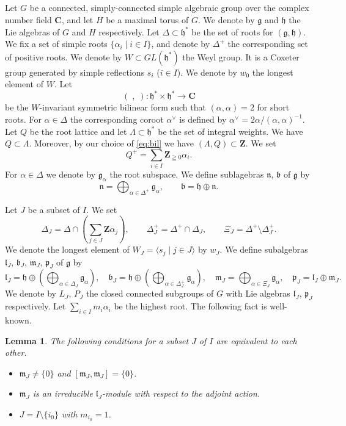 \documentclass[a4paper, 12pt, leqno]{amsart}
\newtheorem{lemma}{{\sc Lemma}}[section]
\theoremstyle{definition}
\numberwithin{equation}{section}
\def\Gb{{\mathfrak{b}}}
\def\Gg{{\mathfrak{g}}}
\def\Gh{{\mathfrak{h}}}
\def\Gl{{\mathfrak{l}}}
\def\Gm{{\mathfrak{m}}}
\def\Gn{{\mathfrak{n}}}
\def\Gp{{\mathfrak{p}}}
\def\BC{{\mathbf{C}}}
\def\BZ{{\mathbf{Z}}}
\begin{document}
\subsection{}
Let $G$ be a connected, simply-connected simple algebraic group over the complex number field $\BC$, and let $H$ be a maximal torus of $G$.
We denote by $\Gg$ and $\Gh$ the Lie algebras of $G$ and $H$ respectively.
Let $\Delta\subset\Gh^*$ be the set of roots for $(\Gg,\Gh)$.
We fix a set of simple roots $\{\alpha_i\mid i\in I\}$, and denote by $\Delta^+$ the corresponding set of positive roots.
We denote by $W\subset GL(\Gh^*)$ the Weyl group.
It is a Coxeter group generated by simple reflections $s_i$ ($i\in I$).
We denote by $w_0$ the longest element of $W$.
Let 
\begin{equation}
\label{eq:bil}
(\;,\;):\Gh^*\times\Gh^*\to\BC
\end{equation}
be the $W$-invariant symmetric bilinear form such that $(\alpha,\alpha)=2$ for short roots.
For $\alpha\in\Delta$ the corresponding coroot $\alpha^\vee$ is defined by $\alpha^\vee=2\alpha/(\alpha,\alpha)^{-1}$.
Let $Q$ 
be the root lattice 
and let $\Lambda\subset\Gh^*$ be the set of integral weights.
We have $Q\subset \Lambda$.
Moreover, 
by our choice of \eqref{eq:bil}
we have 
$(\Lambda, Q)\subset\BZ$.
We set
\[
Q^+=\sum_{i\in I}\BZ_{\geqq0}\alpha_i.
\]
For $\alpha\in\Delta$ we denote by $\Gg_\alpha$ the root subspace.
We define sublagebras $\Gn$, $\Gb$ of $\Gg$ by
\[
\Gn=\bigoplus_{\alpha\in\Delta^+}\Gg_\alpha,
\qquad
\Gb=\Gh\oplus\Gn.
\]


Let  $J$ be a subset of $I$. 
We set
\[
\Delta_J=\Delta\cap\left(
\sum_{j\in J}\BZ\alpha_j\right),
\qquad
\Delta_J^+=\Delta^+\cap\Delta_J,
\qquad
\Xi_J=\Delta^+\setminus\Delta_J^+.
\]
We denote the longest element of $W_J=\langle s_j\mid j\in J\rangle$ by $w_J$.
We define subalgebras $\Gl_J$, $\Gb_J$, $\Gm_J$, $\Gp_J$ of $\Gg$ by
\[
\Gl_J=\Gh\oplus\left(\bigoplus_{\alpha\in\Delta_J}\Gg_\alpha\right),
\quad
\Gb_J=\Gh\oplus\left(\bigoplus_{\alpha\in\Delta^+_J}\Gg_\alpha\right),
\quad
\Gm_J=\bigoplus_{\alpha\in\Xi_J}\Gg_\alpha,
\quad
\Gp_J=\Gl_J\oplus\Gm_J.
\]
We denote by $L_J$, $P_J$ the closed connected subgroups of $G$ with Lie algebras $\Gl_J$, $\Gp_J$ respectively.
Let $\sum_{i\in I}m_i\alpha_i$ be the highest root.
The following fact is well-known.
\begin{lemma}
\label{lem:irred}
The following conditions for a subset $J$ of $I$ are equivalent to each other.
\begin{itemize}
\item[(a)] 
$\Gm_J\ne\{0\}$ and $[\Gm_J,\Gm_J]=\{0\}$.
\item[(b)] 
$\Gm_J$ is an irreducible $\Gl_J$-module with respect to the adjoint action.
\item[(c)] 
$J=I\setminus\{i_0\}$ with $m_{i_0}=1$.

\end{itemize}
\end{lemma}
\end{document}
